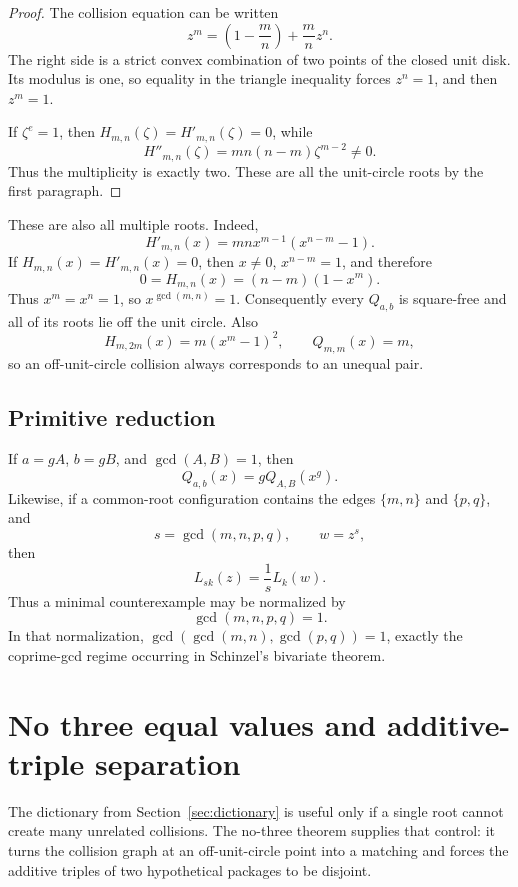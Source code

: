 \documentclass[11pt]{article}
\numberwithin{equation}{section}
\theoremstyle{definition}
\begin{document}
\begin{proof}
The collision equation can be written
\[
 z^m=\left(1-\frac mn\right)+\frac mn z^n.
\]
The right side is a strict convex combination of two points of the closed unit
disk.  Its modulus is one, so equality in the triangle inequality forces
\(z^n=1\), and then \(z^m=1\).

If \(\zeta^e=1\), then \(H_{m,n}(\zeta)=H'_{m,n}(\zeta)=0\), while
\[
 H''_{m,n}(\zeta)
 =mn(n-m)\zeta^{m-2}\neq0.
\]
Thus the multiplicity is exactly two.  These are all the unit-circle roots by
the first paragraph.
\end{proof}

These are also all multiple roots.  Indeed,
\[
 H'_{m,n}(x)=mnx^{m-1}(x^{n-m}-1).
\]
If \(H_{m,n}(x)=H'_{m,n}(x)=0\), then \(x\neq0\),
\(x^{n-m}=1\), and therefore
\[
 0=H_{m,n}(x)=(n-m)(1-x^m).
\]
Thus \(x^m=x^n=1\), so \(x^{\gcd(m,n)}=1\).  Consequently every
\(Q_{a,b}\) is square-free and all of its roots lie off the unit circle.
Also
\[
 H_{m,2m}(x)=m(x^m-1)^2,\qquad Q_{m,m}(x)=m,
\]
so an off-unit-circle collision always corresponds to an unequal pair.

\subsection{Primitive reduction}

If \(a=gA\), \(b=gB\), and \(\gcd(A,B)=1\), then
\begin{equation}
 Q_{a,b}(x)=gQ_{A,B}(x^g).
 \label{eq:2-5}
\end{equation}
Likewise, if a common-root configuration contains the edges \(\{m,n\}\) and
\(\{p,q\}\), and
\[
 s=\gcd(m,n,p,q),\qquad w=z^s,
\]
then
\begin{equation}
 L_{sk}(z)=\frac1sL_k(w).
 \label{eq:2-6}
\end{equation}
Thus a minimal counterexample may be normalized by
\[
 \gcd(m,n,p,q)=1.
 \label{eq:2-7}
\]
In that normalization,
\(\gcd(\gcd(m,n),\gcd(p,q))=1\), exactly the coprime-gcd regime occurring in
Schinzel's bivariate theorem.

\section{No three equal values and additive-triple separation}

The dictionary from Section~\ref{sec:dictionary} is useful only if a single root cannot create many unrelated collisions.  The no-three theorem supplies that control: it turns the collision graph at an off-unit-circle point into a matching and forces the additive triples of two hypothetical packages to be disjoint.
\end{document}
